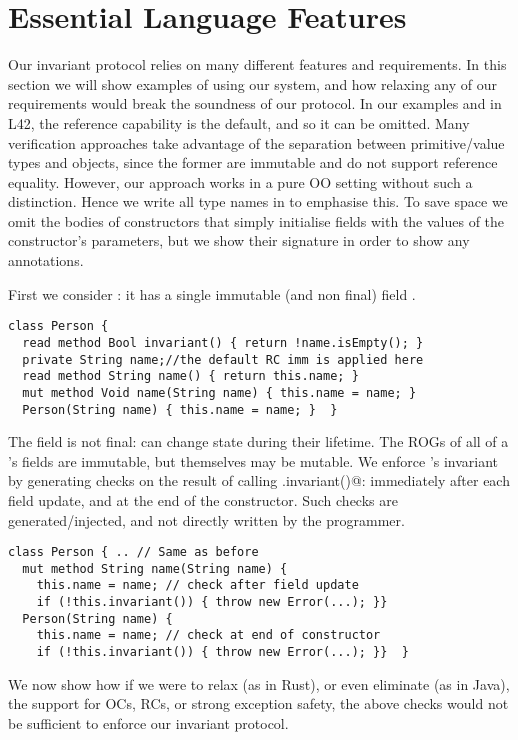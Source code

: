 \section{Essential Language Features}
\label{s:immutable}
Our invariant protocol relies on many different features and requirements. In this section 
we will show examples of using our system, and how relaxing any of our requirements would break the soundness of our protocol.
In our examples and in L42, the reference capability \Q@imm@ is the default, and so it can be omitted.
Many verification approaches take advantage of the separation between primitive/value types and objects, since the former are immutable and do not support reference equality.
However, our approach works in a pure OO setting without such a distinction. Hence we write all type names in \Q@BoldTitleCase@ to emphasise this. 
To save space we omit the bodies of constructors that simply initialise fields with the values of the constructor's parameters, but we show their signature in order to show any annotations.

First we consider
\Q@Person@: it has a single immutable (and non final) field \Q@name@.
\begin{lstlisting}
class Person {
  read method Bool invariant() { return !name.isEmpty(); }
  private String name;//the default RC imm is applied here
  read method String name() { return this.name; }
  mut method Void name(String name) { this.name = name; }
  Person(String name) { this.name = name; }  }
\end{lstlisting}
The \Q@name@ field is not final: \Q@Person@s can change state during their lifetime. The ROGs of all of a \Q@Person@'s fields are immutable, but \Q@Person@s themselves may be mutable.
We enforce \Q@Person@'s invariant by generating checks on the result of calling \Q@this.invariant()@: immediately after each field update, and at the end of the constructor.
Such checks are generated/injected, and not directly written by the programmer.
\begin{lstlisting}
class Person { .. // Same as before
  mut method String name(String name) {
    this.name = name; // check after field update
    if (!this.invariant()) { throw new Error(...); }}
  Person(String name) {
    this.name = name; // check at end of constructor
    if (!this.invariant()) { throw new Error(...); }}  }
\end{lstlisting}
We now show how if we were to relax (as in Rust), or even eliminate (as in Java), the support for OCs, RCs, or strong exception safety, the above checks would not be sufficient to enforce our invariant protocol.

